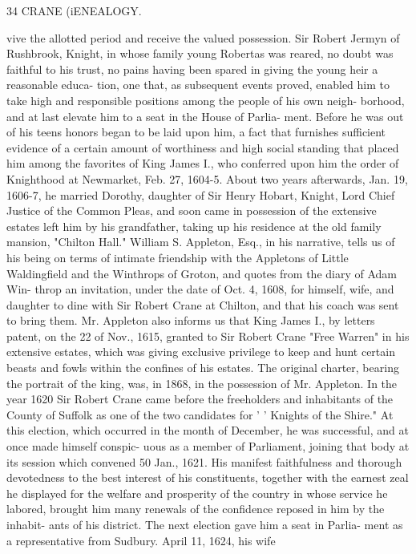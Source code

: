 \documentclass{book}
\begin{document}
34 CRANE (iENEALOGY. 

vive the allotted period and receive the valued possession. Sir 
Robert Jermyn of Rushbrook, Knight, in whose family young 
Robertas was reared, no doubt was faithful to his trust, no pains 
having been spared in giving the young heir a reasonable educa- 
tion, one that, as subsequent events proved, enabled him to take 
high and responsible positions among the people of his own neigh- 
borhood, and at last elevate him to a seat in the House of Parlia- 
ment. Before he was out of his teens honors began to be laid 
upon him, a fact that furnishes sufficient evidence of a certain 
amount of worthiness and high social standing that placed him 
among the favorites of King James I., who conferred upon him 
the order of Knighthood at Newmarket, Feb. 27, 1604-5. About 
two years afterwards, Jan. 19, 1606-7, he married Dorothy, 
daughter of Sir Henry Hobart, Knight, Lord Chief Justice of the 
Common Pleas, and soon came in possession of the extensive 
estates left him by his grandfather, taking up his residence at the 
old family mansion, "Chilton Hall." William S. Appleton, 
Esq., in his narrative, tells us of his being on terms of intimate 
friendship with the Appletons of Little Waldingfield and the 
Winthrops of Groton, and quotes from the diary of Adam Win- 
throp an invitation, under the date of Oct. 4, 1608, for himself, 
wife, and daughter to dine with Sir Robert Crane at Chilton, and 
that his coach was sent to bring them. Mr. Appleton also 
informs us that King James I., by letters patent, on the 22 of 
Nov., 1615, granted to Sir Robert Crane "Free Warren" in his 
extensive estates, which was giving exclusive privilege to keep 
and hunt certain beasts and fowls within the confines of his 
estates. The original charter, bearing the portrait of the king, 
was, in 1868, in the possession of Mr. Appleton. In the year 
1620 Sir Robert Crane came before the freeholders and inhabitants 
of the County of Suffolk as one of the two candidates for ' ' Knights 
of the Shire." At this election, which occurred in the month of 
December, he was successful, and at once made himself conspic- 
uous as a member of Parliament, joining that body at its session 
which convened 50 Jan., 1621. His manifest faithfulness and 
thorough devotedness to the best interest of his constituents, 
together with the earnest zeal he displayed for the welfare and 
prosperity of the country in whose service he labored, brought 
him many renewals of the confidence reposed in him by the inhabit- 
ants of his district. The next election gave him a seat in Parlia- 
ment as a representative from Sudbury. April 11, 1624, his wife 
\end{document}
